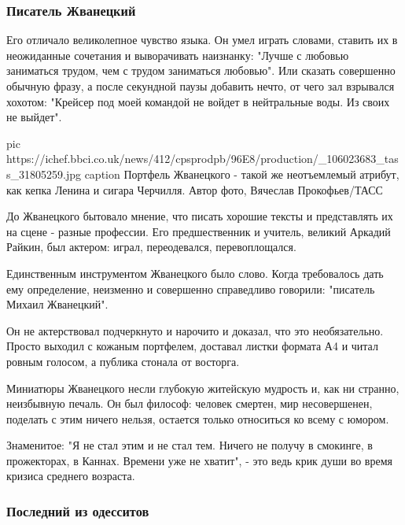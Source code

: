 
\subsubsection{Писатель Жванецкий}

Его отличало великолепное чувство языка. Он умел играть словами, ставить их в
неожиданные сочетания и выворачивать наизнанку: "Лучше с любовью заниматься
трудом, чем с трудом заниматься любовью". Или сказать совершенно обычную фразу,
а после секундной паузы добавить нечто, от чего зал взрывался хохотом: "Крейсер
под моей командой не войдет в нейтральные воды. Из своих не выйдет".

\ifcmt
pic https://ichef.bbci.co.uk/news/412/cpsprodpb/96E8/production/_106023683_tass_31805259.jpg
caption Портфель Жванецкого - такой же неотъемлемый атрибут, как кепка Ленина и сигара Черчилля. Автор фото, Вячеслав Прокофьев/ТАСС
\fi

До Жванецкого бытовало мнение, что писать хорошие тексты и представлять их
на сцене - разные профессии. Его предшественник и учитель, великий Аркадий
Райкин, был актером: играл, переодевался, перевоплощался.

Единственным инструментом Жванецкого было слово. Когда требовалось дать
ему определение, неизменно и совершенно справедливо говорили: "писатель
Михаил Жванецкий".

Он не актерствовал подчеркнуто и нарочито и доказал, что это
необязательно. Просто выходил с кожаным портфелем, доставал листки формата
А4 и читал ровным голосом, а публика стонала от восторга.

Миниатюры Жванецкого несли глубокую житейскую мудрость и, как ни странно,
неизбывную печаль. Он был философ: человек смертен, мир несовершенен,
поделать с этим ничего нельзя, остается только относиться ко всему с
юмором.

Знаменитое: "Я не стал этим и не стал тем. Ничего не получу в смокинге, в
прожекторах, в Каннах. Времени уже не хватит", - это ведь крик души во
время кризиса среднего возраста.

\subsubsection{Последний из одесситов}


